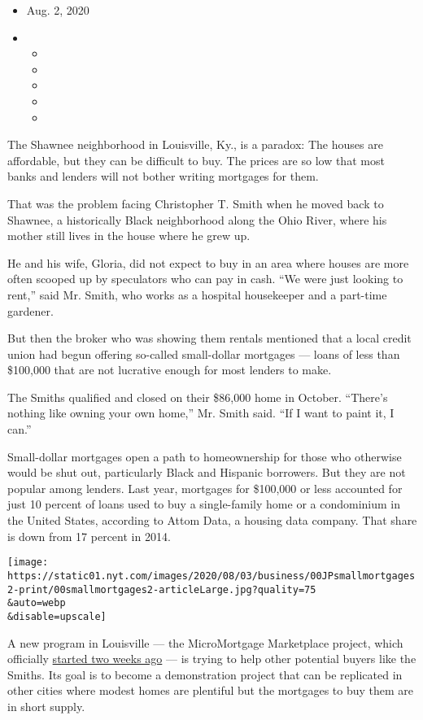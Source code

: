 \begin{itemize}
\item
  Aug. 2, 2020
\item
  \begin{itemize}
  \item
  \item
  \item
  \item
  \item
  \end{itemize}
\end{itemize}

The Shawnee neighborhood in Louisville, Ky., is a paradox: The houses
are affordable, but they can be difficult to buy. The prices are so low
that most banks and lenders will not bother writing mortgages for them.

That was the problem facing Christopher T. Smith when he moved back to
Shawnee, a historically Black neighborhood along the Ohio River, where
his mother still lives in the house where he grew up.

He and his wife, Gloria, did not expect to buy in an area where houses
are more often scooped up by speculators who can pay in cash. ``We were
just looking to rent,'' said Mr. Smith, who works as a hospital
housekeeper and a part-time gardener.

But then the broker who was showing them rentals mentioned that a local
credit union had begun offering so-called small-dollar mortgages ---
loans of less than \$100,000 that are not lucrative enough for most
lenders to make.

The Smiths qualified and closed on their \$86,000 home in October.
``There's nothing like owning your own home,'' Mr. Smith said. ``If I
want to paint it, I can.''

Small-dollar mortgages open a path to homeownership for those who
otherwise would be shut out, particularly Black and Hispanic borrowers.
But they are not popular among lenders. Last year, mortgages for
\$100,000 or less accounted for just 10 percent of loans used to buy a
single-family home or a condominium in the United States, according to
Attom Data, a housing data company. That share is down from 17 percent
in 2014.

\texttt{[image: https://static01.nyt.com/images/2020/08/03/business/00JPsmallmortgages2-print/00smallmortgages2-articleLarge.jpg?quality=75\\\&auto=webp\\\&disable=upscale]}

A new program in Louisville --- the MicroMortgage Marketplace project,
which officially
\href{https://www.newswire.com/news/micromortgage-marketplace-launches-in-support-of-small-dollar-home-21180593}{started
two weeks ago} --- is trying to help other potential buyers like the
Smiths. Its goal is to become a demonstration project that can be
replicated in other cities where modest homes are plentiful but the
mortgages to buy them are in short supply.

